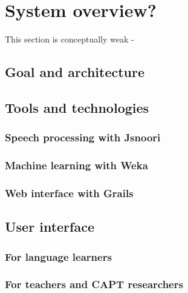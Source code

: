 \chapter{System overview?}
\label{chap:system}
This section is conceptually weak - 

\section{Goal and architecture}
\label{sec:system:goal}

\section{Tools and technologies}
\label{sec:system:tools}
\subsection{Speech processing with Jsnoori}
\subsection{Machine learning with Weka}
\subsection{Web interface with Grails} %

\section{User interface}
\label{sec:system:interface}
\subsection{For language learners}
\subsection{For teachers and CAPT researchers}
